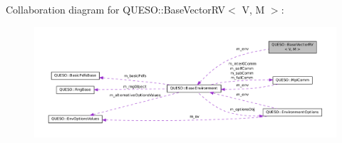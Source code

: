 Collaboration diagram for Q\-U\-E\-S\-O\-:\-:Base\-Vector\-R\-V$<$ V, M $>$\-:
\nopagebreak
\begin{figure}[H]
\begin{center}
\leavevmode
\includegraphics[width=350pt]{class_q_u_e_s_o_1_1_base_vector_r_v__coll__graph}
\end{center}
\end{figure}
